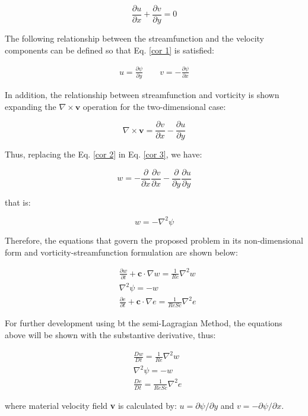 \begin{equation} \label{cor 1}
 \frac{\partial u}{\partial x}
 +
 \frac{\partial v}{\partial y}
 =
 0
\end{equation}
 
\medskip
The following relationship between the streamfunction and
 the velocity components can be defined so that
 Eq. \ref{cor 1} is satisfied:


\begin{equation} \label{cor 2}
\begin{aligned}
 u = \frac{\partial \psi}{\partial y}
 \qquad
 v = - \frac{\partial \psi}{\partial x}
\end{aligned}
\end{equation}

\medskip
In addition, the relationship between streamfunction
and vorticity is shown expanding the
$\nabla \times \textbf{v}$ operation
for the two-dimensional case:


\begin{equation} \label{cor 3}
 \nabla \times \textbf{v}
 = 
 \frac{\partial v}{\partial x}
 - 
 \frac{\partial u}{\partial y}
\end{equation}

\medskip
\noindent
Thus, replacing the 
Eq. \ref{cor 2} in Eq. \ref{cor 3},
we have:

\begin{equation}
 w
 =
 - 
 \frac{\partial}{\partial x} \frac{\partial v}{\partial x}
 -
 \frac{\partial}{\partial y} \frac{\partial u}{\partial y}
\end{equation}

\medskip
\noindent
that is:

\begin{equation}
 w
 = 
 -
 \nabla^{2} \psi
\end{equation}

\medskip
Therefore, the equations that govern the proposed problem
in its non-dimensional form and vorticity-streamfunction formulation
are shown below:

\begin{align}
& \frac{\partial w}{\partial t}
 +
 \textbf{c} \cdot \nabla w
 =
 \frac{1}{Re} \nabla^{2} w
 \\[10pt] 
& \nabla^{2} \psi
 = 
 - 
 w \\[10pt]
& \frac{\partial e}{\partial t}
 +
 \textbf{c} \cdot \nabla e
 =
 \frac{1}{ReSc} \nabla^{2} e
\end{align}

\medskip
For further development using bt the semi-Lagragian Method,
the equations above will be shown with the substantive derivative,
thus:

\begin{align}
& \frac{D w}{D t}
 =
 \frac{1}{Re} \nabla^{2} w \label{vorticidade}
 \\[10pt] 
& \nabla^{2} \psi
 = 
 - 
 w \label{corrente} \\[10pt]
& \frac{D e}{Dt}
 =
 \frac{1}{ReSc} \nabla^{2} e \label{especie quimica}
\end{align}

\medskip
\noindent
where material velocity field \textbf{v} is calculated by:
$u = \partial \psi / \partial y$ and 
$v = - \partial \psi / \partial x$. 
